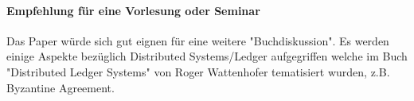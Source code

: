 \documentclass[11pt,a4paper]{article}
\begin{document}
\newpage

\paragraph*{Empfehlung f\"ur eine Vorlesung oder Seminar}
Das Paper \cite{Gilad:2017:ASB:3132747.3132757} w\"urde sich gut eignen f\"ur eine weitere "Buchdiskussion".
Es werden einige Aspekte bez\"uglich Distributed Systems/Ledger aufgegriffen welche 
im Buch "Distributed Ledger Systems" von Roger Wattenhofer tematisiert wurden, z.B. Byzantine Agreement.

\cite{Gilad:2017:ASB:3132747.3132757}
\cite{Chen:2017}


\newpage


% 
{}
\end{document}
